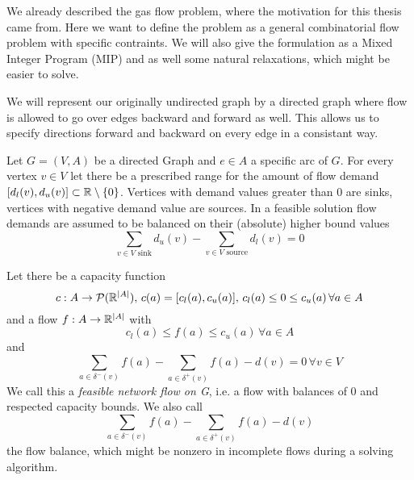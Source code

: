 We already described the gas flow problem, where the motivation for this thesis came from. Here we want to define the 
problem as a general combinatorial flow problem with specific contraints. We will also give the formulation as a Mixed 
Integer Program (MIP) and as well some natural relaxations, which might be easier to solve.

We will represent our originally undirected graph by a directed graph where flow is allowed to go over edges backward 
and forward as well. This allows us to specify directions forward and backward on every edge in a consistant way. 


\begin{definition}
 Let $G=(V,A)$ be a directed Graph and $e \in A$ a specific arc of $G$. For every vertex $v\in V$ let there be a 
prescribed range for the amount of flow demand $[d_l(v), d_u(v)]\subset \mathbb{R} \setminus \{0\}$. Vertices with demand 
values greater than 0 are sinks, vertices with negative demand value are sources. In a feasible solution flow 
demands are assumed to be balanced on their (absolute) higher bound values 
$$\sum_{v \in V\textrm{ sink}}d_u(v)-\sum_{v \in V\textrm{ source}}d_l(v)=0$$ 

Let there be a capacity function 
$$c:A\to \mathcal{P}(\mathbb{R}^{|A|}), \, c(a)=[c_l(a), c_u(a)],\, c_l(a)\le 0 \le c_u(a) \, \forall a\in A$$
and a flow  $f: A\to\mathbb{R}^{|A|} $ with $$c_l(a)\le f(a)\le 
c_u(a)\, \forall a\in A$$ and $$\sum_{a\in\delta^-(v)}f(a)-\sum_{a\in\delta^+(v)}f(a)-d(v) = 0 \, \forall v\in V$$
We call this a \textit{feasible network flow on G}, i.e. a flow with balances of 0 and respected capacity bounds.
We also call $$\sum_{a\in \delta^-(v)}f(a)-\sum_{a\in\delta^+(v)}f(a)-d(v)$$ the flow balance, which might be nonzero 
in incomplete flows during a solving algorithm.\\
\end{definition}

